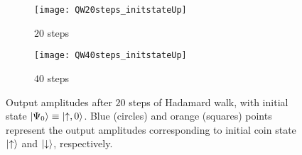 \begin{figure}[tb]
    \begin{subfigure}{0.5\textwidth}
        \centering
        \caption{$20$ steps}
        \texttt{[image: QW20steps\_initstateUp]}
    \end{subfigure}%
    \begin{subfigure}{0.5\textwidth}
        \centering
        \caption{$40$ steps}
        \texttt{[image: QW40steps\_initstateUp]}
    \end{subfigure}
    \caption{
    	Output amplitudes after $20$ steps of Hadamard walk, with initial state $\ket{\Psi_0}\equiv\ket{\uparrow,0}$.
        Blue (circles) and orange (squares) points represent the output amplitudes corresponding to initial coin state $\ket\uparrow$ and $\ket\downarrow$, respectively.
    }
    \label{fig:intro:hadamardwalk_Nsteps2}
\end{figure}



